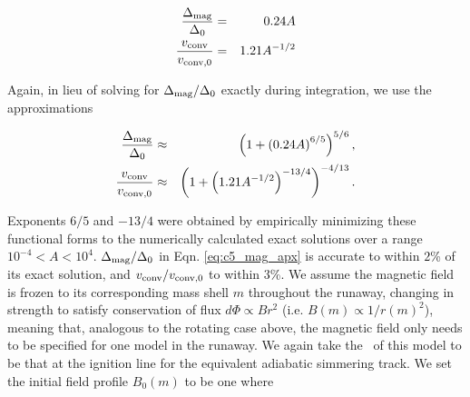 

\begin{eqnarray}
\frac{\dnabmag}{\dnabconvzero} &=& 0.24A \nonumber \\
\frac{\vconv}{\vconvzero} &=& 1.21A^{-1/2}
\label{eq:c5_mag_exactsoln}
\end{eqnarray}

\noindent Again, in lieu of solving for $\dnabmag/\dnabconvzero$ exactly during integration, we use the approximations 

\begin{eqnarray}
\frac{\dnabmag}{\dnabconvzero} &\approx& \left(1 + \left(0.24A\right)^{6/5}\right)^{5/6}, \nonumber \\
\frac{\vconv}{\vconvzero} &\approx& \left(1 + \left(1.21A^{-1/2}\right)^{-13/4}\right)^{-4/13}.
\label{eq:c5_mag_apx}
\end{eqnarray}

\noindent Exponents $6/5$ and $-13/4$ were obtained by empirically minimizing these functional forms to the numerically calculated exact solutions over a range $10^{-4} < A < 10^4$.  $\dnabmag/\dnabconvzero$ in Eqn. \ref{eq:c5_mag_apx} is accurate to within $2$\% of its exact solution, and $\vconv/\vconvzero$ to within $3$\%.  We assume the magnetic field is frozen to its corresponding mass shell $m$ throughout the runaway, changing in strength to satisfy conservation of flux $d\Phi \propto B r^2$ (i.e. $B(m) \propto 1/r(m)^2$), meaning that, analogous to the rotating case above, the magnetic field only needs to be specified for one model in the runaway.  We again take the \Sc\ of this model to be that at the ignition line for the equivalent adiabatic simmering track.  We set the initial field profile $B_0(m)$ to be one where

